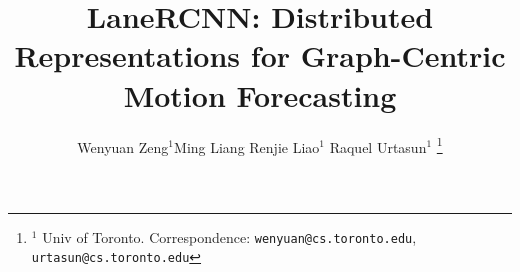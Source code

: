 \documentclass[letterpaper, 10 pt, conference]{ieeeconf}  %
\title{\LARGE \bf
LaneRCNN: Distributed Representations for Graph-Centric Motion Forecasting
}
\author{
  Wenyuan Zeng$^{1}$\quad Ming Liang \quad Renjie Liao$^{1}$ \quad
  Raquel Urtasun$^{1}$%
  \thanks{$^{1}$ {Univ of Toronto. Correspondence}:
\texttt{wenyuan@cs.toronto.edu}, \texttt{urtasun@cs.toronto.edu}}%
}
\begin{document}
\maketitle
\thispagestyle{empty}
\pagestyle{empty}


\begin{abstract}

\end{abstract}









% 











\end{document}

